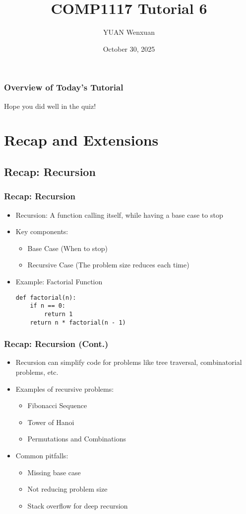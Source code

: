 \documentclass{beamer}
\title{COMP1117 Tutorial 6}
\author{YUAN Wenxuan}
\date{October 30, 2025}
\begin{document}
\frame{\titlepage}

\begin{frame}
    \frametitle{Overview of Today's Tutorial}
    Hope you did well in the quiz!
    \tableofcontents
\end{frame}

\section{Recap and Extensions}
\subsection{Recap: Recursion}
\begin{frame}[fragile]
    \frametitle{Recap: Recursion}
    \begin{itemize}
        \item Recursion: A function calling itself, while having a base case to stop
        \item Key components:
              \begin{itemize}
                  \item Base Case (When to stop)
                  \item Recursive Case (The problem size reduces each time)
              \end{itemize}
        \item Example: Factorial Function
              \begin{verbatim}
def factorial(n):
    if n == 0:
        return 1
    return n * factorial(n - 1)
        \end{verbatim}
    \end{itemize}
\end{frame}
\begin{frame}
    \frametitle{Recap: Recursion (Cont.)}
    \begin{itemize}
        \item Recursion can simplify code for problems like tree traversal, combinatorial problems, etc.
        \item Examples of recursive problems:
              \begin{itemize}
                  \item Fibonacci Sequence
                  \item Tower of Hanoi
                  \item Permutations and Combinations
              \end{itemize}
        \item Common pitfalls:
              \begin{itemize}
                  \item Missing base case
                  \item Not reducing problem size
                  \item Stack overflow for deep recursion
              \end{itemize}
    \end{itemize}
\end{frame}
\end{document}
